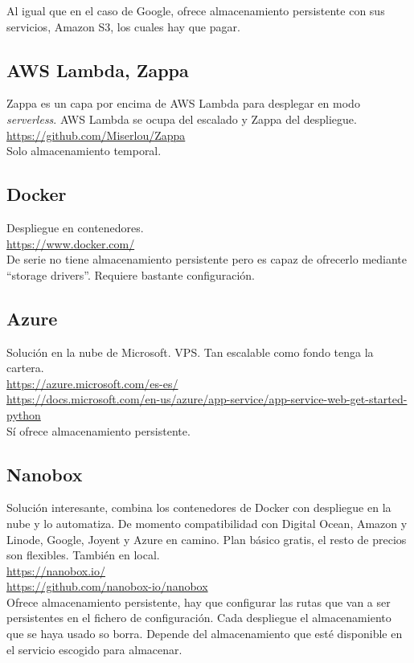 Al igual que en el caso de Google, ofrece almacenamiento persistente con sus
servicios, Amazon S3, los cuales hay que pagar.
\subsection{AWS Lambda, Zappa}
Zappa es un capa por encima de AWS Lambda para desplegar en modo
\textit{serverless}. AWS Lambda se ocupa del escalado y Zappa del despliegue.\\
\url{https://github.com/Miserlou/Zappa}\\

Solo almacenamiento temporal.
\subsection{Docker}
Despliegue en contenedores.\\
\url{https://www.docker.com/}\\

De serie no tiene almacenamiento persistente pero es capaz de ofrecerlo mediante
``storage drivers''. Requiere bastante configuración.
\subsection{Azure}
Solución en la nube de Microsoft. VPS. Tan escalable como fondo tenga la
cartera.\\
\url{https://azure.microsoft.com/es-es/}\\
\url{https://docs.microsoft.com/en-us/azure/app-service/app-service-web-get-started-python}\\

Sí ofrece almacenamiento persistente.
\subsection{Nanobox}\label{nanobox}
Solución interesante, combina los contenedores de Docker con despliegue en la
nube y lo automatiza. De momento compatibilidad con Digital Ocean, Amazon y
Linode, Google, Joyent y Azure en camino. Plan básico gratis, el resto de
precios son flexibles. También en local.\\
\url{https://nanobox.io/}\\
\url{https://github.com/nanobox-io/nanobox}\\

Ofrece almacenamiento persistente, hay que configurar las rutas que van a ser
persistentes en el fichero de configuración. Cada despliegue el almacenamiento
que se haya usado so borra. Depende del almacenamiento que esté disponible en el
servicio escogido para almacenar.
